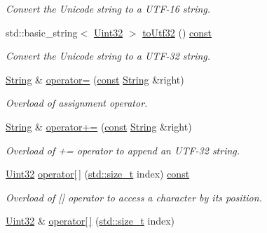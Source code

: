 \begin{DoxyCompactItemize}
\begin{DoxyCompactList}\small\item\em Convert the Unicode string to a U\-T\-F-\/16 string. \end{DoxyCompactList}\item 
std\-::basic\-\_\-string$<$ \hyperlink{namespacesf_aa746fb1ddef4410bddf198ebb27e727c}{Uint32} $>$ \hyperlink{classsf_1_1_string_a70f6bdf579125e1cb52329e34a981168}{to\-Utf32} () \hyperlink{term__entry_8h_a57bd63ce7f9a353488880e3de6692d5a}{const} 
\begin{DoxyCompactList}\small\item\em Convert the Unicode string to a U\-T\-F-\/32 string. \end{DoxyCompactList}\item 
\hyperlink{classsf_1_1_string}{String} \& \hyperlink{classsf_1_1_string_a096255c066e5ef8c31952216b8ce9c42}{operator=} (\hyperlink{term__entry_8h_a57bd63ce7f9a353488880e3de6692d5a}{const} \hyperlink{classsf_1_1_string}{String} \&right)
\begin{DoxyCompactList}\small\item\em Overload of assignment operator. \end{DoxyCompactList}\item 
\hyperlink{classsf_1_1_string}{String} \& \hyperlink{classsf_1_1_string_ae6563ce2c243ae2160eea8a354199f4e}{operator+=} (\hyperlink{term__entry_8h_a57bd63ce7f9a353488880e3de6692d5a}{const} \hyperlink{classsf_1_1_string}{String} \&right)
\begin{DoxyCompactList}\small\item\em Overload of += operator to append an U\-T\-F-\/32 string. \end{DoxyCompactList}\item 
\hyperlink{namespacesf_aa746fb1ddef4410bddf198ebb27e727c}{Uint32} \hyperlink{classsf_1_1_string_a649b89a65866bf03652f7b5cb6de3bb6}{operator\mbox{[}$\,$\mbox{]}} (\hyperlink{nc__alloc_8h_a7b60c5629e55e8ec87a4547dd4abced4}{std\-::size\-\_\-t} index) \hyperlink{term__entry_8h_a57bd63ce7f9a353488880e3de6692d5a}{const} 
\begin{DoxyCompactList}\small\item\em Overload of \mbox{[}\mbox{]} operator to access a character by its position. \end{DoxyCompactList}\item 
\hyperlink{namespacesf_aa746fb1ddef4410bddf198ebb27e727c}{Uint32} \& \hyperlink{classsf_1_1_string_abc989da7f4fb873ab29188d40772ab24}{operator\mbox{[}$\,$\mbox{]}} (\hyperlink{nc__alloc_8h_a7b60c5629e55e8ec87a4547dd4abced4}{std\-::size\-\_\-t} index)

\end{DoxyCompactItemize}
